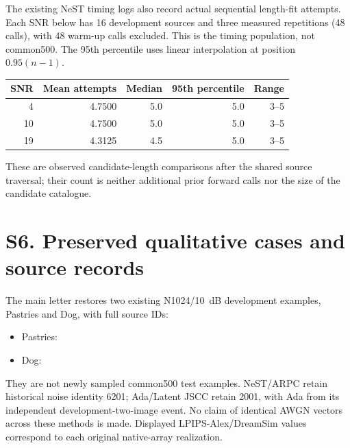 \documentclass[11pt,letterpaper]{article}
\begin{document}
The existing NeST timing logs also record actual sequential length-fit attempts. Each SNR below has 16 development sources and three measured repetitions (48 calls), with 48 warm-up calls excluded. This is the timing population, not common500. The 95th percentile uses linear interpolation at position $0.95(n-1)$.
\begin{center}\small\begin{tabular}{rrrrr}\toprule
SNR & Mean attempts & Median & 95th percentile & Range\\\midrule

4 & 4.7500 & 5.0 & 5.0 & 3--5\\
10 & 4.7500 & 5.0 & 5.0 & 3--5\\
19 & 4.3125 & 4.5 & 5.0 & 3--5\\
\bottomrule\end{tabular}\end{center}
These are observed candidate-length comparisons after the shared source traversal; their count is neither additional prior forward calls nor the size of the candidate catalogue.


\clearpage\section*{S6. Preserved qualitative cases and source records}
The main letter restores two existing N1024/10~dB development examples, Pastries and Dog, with full source IDs:
\begin{itemize}
\item Pastries: 
\item Dog: 
\end{itemize}
They are not newly sampled common500 test examples. NeST/ARPC retain historical noise identity 6201; Ada/Latent JSCC retain 2001, with Ada from its independent development-two-image event. No claim of identical AWGN vectors across these methods is made. Displayed LPIPS-Alex/DreamSim values correspond to each original native-array realization.
\end{document}
